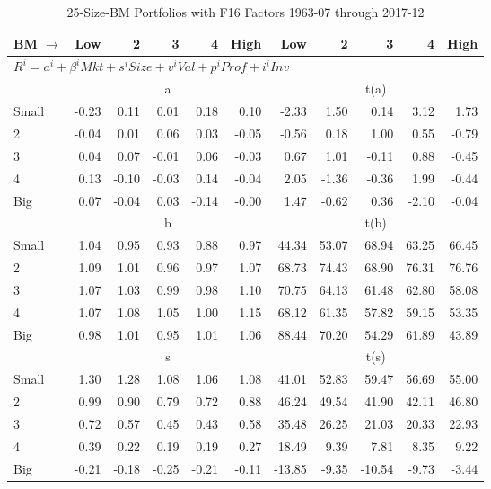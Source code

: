 
\begin{table}[!ht]
\footnotesize
\centering
\caption{25-Size-BM Portfolios with F16 Factors 1963-07 through 2017-12}
\begin{tabular}{lrrrrrrrrrr}
  \toprule
    
    BM $\rightarrow$ & Low & 2 & 3 & 4 & High & Low & 2 & 3 & 4 & High  \\ 
  \midrule
  \multicolumn{11}{l}{$R^i=a^i+\beta^iMkt+s^iSize+v^iVal+p^iProf+i^iInv$}  \\
  
     & \multicolumn{5}{c}{a} & \multicolumn{5}{c}{t(a)}   \\
     \cmidrule(r){2-6} \cmidrule(r){7-11} 
    Small  & -0.23  & 0.11  & 0.01  & 0.18  & 0.10  & -2.33  & 1.50  & 0.14  & 3.12  & 1.73   \\
    2  & -0.04  & 0.01  & 0.06  & 0.03  & -0.05  & -0.56  & 0.18  & 1.00  & 0.55  & -0.79   \\
    3  & 0.04  & 0.07  & -0.01  & 0.06  & -0.03  & 0.67  & 1.01  & -0.11  & 0.88  & -0.45   \\
    4  & 0.13  & -0.10  & -0.03  & 0.14  & -0.04  & 2.05  & -1.36  & -0.36  & 1.99  & -0.44   \\
    Big  & 0.07  & -0.04  & 0.03  & -0.14  & -0.00  & 1.47  & -0.62  & 0.36  & -2.10  & -0.04   \\
    
  
     & \multicolumn{5}{c}{b} & \multicolumn{5}{c}{t(b)}   \\
     \cmidrule(r){2-6} \cmidrule(r){7-11} 
    Small  & 1.04  & 0.95  & 0.93  & 0.88  & 0.97  & 44.34  & 53.07  & 68.94  & 63.25  & 66.45   \\
    2  & 1.09  & 1.01  & 0.96  & 0.97  & 1.07  & 68.73  & 74.43  & 68.90  & 76.31  & 76.76   \\
    3  & 1.07  & 1.03  & 0.99  & 0.98  & 1.10  & 70.75  & 64.13  & 61.48  & 62.80  & 58.08   \\
    4  & 1.07  & 1.08  & 1.05  & 1.00  & 1.15  & 68.12  & 61.35  & 57.82  & 59.15  & 53.35   \\
    Big  & 0.98  & 1.01  & 0.95  & 1.01  & 1.06  & 88.44  & 70.20  & 54.29  & 61.89  & 43.89   \\
    
  
     & \multicolumn{5}{c}{s} & \multicolumn{5}{c}{t(s)}   \\
     \cmidrule(r){2-6} \cmidrule(r){7-11} 
    Small  & 1.30  & 1.28  & 1.08  & 1.06  & 1.08  & 41.01  & 52.83  & 59.47  & 56.69  & 55.00   \\
    2  & 0.99  & 0.90  & 0.79  & 0.72  & 0.88  & 46.24  & 49.54  & 41.90  & 42.11  & 46.80   \\
    3  & 0.72  & 0.57  & 0.45  & 0.43  & 0.58  & 35.48  & 26.25  & 21.03  & 20.33  & 22.93   \\
    4  & 0.39  & 0.22  & 0.19  & 0.19  & 0.27  & 18.49  & 9.39  & 7.81  & 8.35  & 9.22   \\
    Big  & -0.21  & -0.18  & -0.25  & -0.21  & -0.11  & -13.85  & -9.35  & -10.54  & -9.73  & -3.44   \\
    

\end{tabular}
\end{table}
